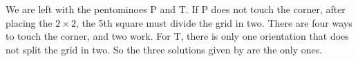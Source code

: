 \documentclass{article}
\theoremstyle{definition} %
\newcommand{\newterm}[1]{\textit{#1}}
\begin{document}
We are left with the pentominoes P and T. If P does not touch the corner, after placing the $2 \times 2$, the 5th square must divide the grid in two. There are four ways to touch the corner, and two work. For T, there is only one orientation that does not split the grid in two. So the three solutions given by \cite[6:04]{v2} are the only ones.








\end{document}
